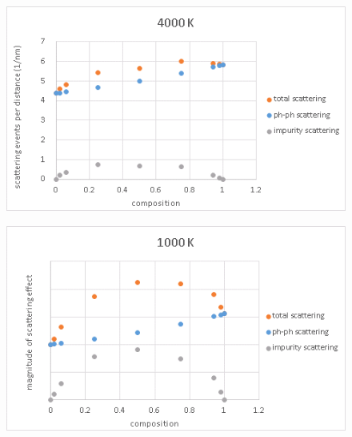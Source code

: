 \begin{figure}[p]
  \includegraphics[width=\linewidth]{Figures/gk_mfp_scattering_4000K.png}
  \caption[gk mfp scattering 4000K]{}
  \label{fig:gk_mfp_scattering_4000K}
\end{figure}

\begin{figure}[h!]
  \includegraphics[width=\linewidth]{Figures/gk_mfp_scattering_1000K.png}
  \caption[gk mfp scattering 1000K]{}
  \label{fig:gk_mfp_scattering_1000K}
\end{figure}

 





%
%



